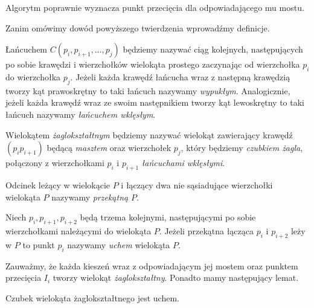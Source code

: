 \begin{twierdzenie}
  Algorytm poprawnie wyznacza punkt przecięcia dla odpowiadającego mu
  mostu.
\end{twierdzenie}

Zanim omówimy dowód powyższego twierdzenia wprowadźmy definicje.

\begin{definicja}
  Łańcuchem $C(p_i,p_{i+1},\ldots,p_j)$ będziemy nazywać ciąg
  kolejnych, następujących po sobie krawędzi i wierzchołków
  wielokąta prostego zaczynając od wierzchołka $p_i$ do wierzchołka
  $p_j$. Jeżeli każda krawędź łańcucha wraz z następną krawędzią
  tworzy kąt prawoskrętny to taki łańcuch nazywamy
  \emph{wypukłym}. Analogicznie, jeżeli każda krawędź wraz ze swoim
  następnikiem tworzy kąt lewoskrętny to taki łańcuch nazywamy
  \emph{łańcuchem wklęsłym}.
\end{definicja}

\begin{definicja}
  Wielokątem \emph{żaglokształtnym} będziemy nazywać wielokąt
  zawierający krawędź $(p_{i}p_{i+1})$ będącą \emph{masztem} oraz
  wierzchołek $p_j$, który będziemy \emph{czubkiem żagla}, połączony z
  wierzchołkami $p_i$ i $p_{i+1}$ \emph{łańcuchami wklęsłymi}.
\end{definicja}

\begin{definicja}
  Odcinek leżący w wielokącie $P$ i łączący dwa nie sąsiadujące
  wierzchołki wielokąta $P$ nazywamy \emph{przekątną} $P$.
\end{definicja}

\begin{definicja}\label{def:ear}
  Niech $p_i, p_{i+1}, p_{i+2}$ będą trzema kolejnymi, następującymi
  po sobie wierzchołkami należącymi do wielokąta $P$. Jeżeli przekątna
  łącząca $p_{i}$ i $p_{i+2}$ leży w $P$ to punkt $p_i$ nazywamy
  \emph{uchem} wielokąta $P$.
\end{definicja}

Zauważmy, że każda kieszeń wraz z odpowiadającym jej mostem oraz
punktem przecięcia $I_i$ tworzy wielokąt
\emph{żaglokształtny}. Ponadto mamy następujący lemat.

\begin{lemat}\label{lem:sailtip}
  Czubek wielokąta żaglokształtnego jest uchem.
\end{lemat}

